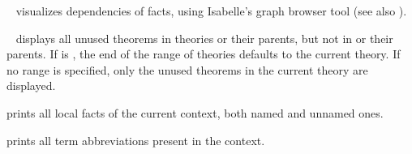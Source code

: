 \begin{isabellebody}
\begin{isamarkuptext}
\begin{description}
  \item \hyperlink{command.thm-deps}{\mbox{}}~
  visualizes dependencies of facts, using Isabelle's graph browser
  tool (see also \cite{isabelle-sys}).

  \item \hyperlink{command.unused-thms}{\mbox{}}~
  displays all unused theorems in theories 
  or their parents, but not in  or their parents.
  If  is , the end of the range of theories
  defaults to the current theory. If no range is specified,
  only the unused theorems in the current theory are displayed.
  
  \item \hyperlink{command.print-facts}{\mbox{}} prints all local facts of the
  current context, both named and unnamed ones.
  
  \item \hyperlink{command.print-binds}{\mbox{}} prints all term abbreviations
  present in the context.


\end{description}
\end{isamarkuptext}
\end{isabellebody}
